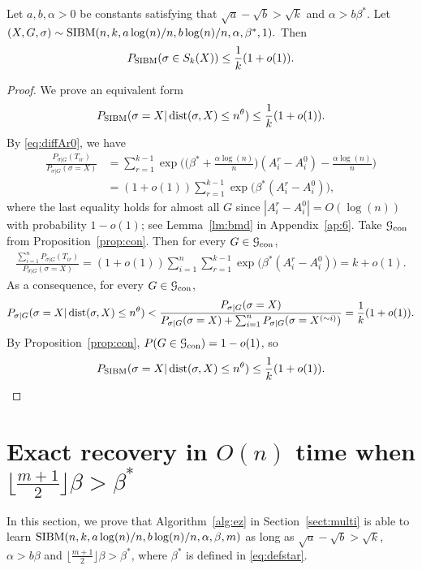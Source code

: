 \documentclass{article}
\begin{document}
\begin{proposition}  \label{prop:zj}
	Let $a,b,\alpha> 0$ be constants satisfying that $\sqrt{a}-\sqrt{b} > \sqrt{k}$ and $\alpha>b\beta^\ast$. Let 
	$
	(X,G,\sigma) \sim \operatorname{SIBM}(n,k, a\log(n)/n, b\log(n)/n,\alpha,\beta^\ast, 1) .
	$
	Then 
	$$
	P_{\operatorname{SIBM}}(\sigma \in S_k(X)) \le \frac{1}{k}(1+o(1)) .
	$$
\end{proposition}
\begin{proof}
	We prove an equivalent form
	$$
	P_{\operatorname{SIBM}}(\sigma = X | \operatorname{dist}(\sigma, X) \le n^{\theta}) \le \frac{1}{k}(1+o(1)) .
	$$
	By \eqref{eq:diffAr0}, we have
	\begin{align*}
	\frac{P_{\sigma|G}(T_{ir})}
	{P_{\sigma|G}(\sigma=X)}
	& = \sum_{r=1}^{k-1}\exp\Big(\big(\beta^\ast+\frac{\alpha\log(n)}{n} \big) (A^r_i-A^0_i)
	-\frac{\alpha\log(n)}{n} \Big) \\
	& = (1+o(1))\sum_{r=1}^{k-1} \exp\big(\beta^\ast (A^r_i-A^0_i) \big)  ,
	\end{align*}
	where the last equality holds for almost all $G$ since $|A^r_i-A^0_i|=O(\log(n))$ with probability $1-o(1)$; see Lemma~\ref{lm:bmd} in Appendix~\ref{ap:6}.
	Take $\mathcal{G}_{\operatorname{con}}$ from Proposition~\ref{prop:con}. Then for every $G\in\mathcal{G}_{\operatorname{con}}$,
	\begin{align*}
	\frac{\sum_{i=1}^n P_{\sigma|G}(T_{ir} )}
	{P_{\sigma|G}(\sigma=X)}  = (1+o(1)) \sum_{i=1}^n \sum_{r=1}^{k-1}\exp\big(\beta^\ast (A^r_i-A^0_i) \big)  =k+o(1) .
	\end{align*}
	As a consequence, for every $G\in\mathcal{G}_{\operatorname{con}}$,
	\begin{align*}
	P_{\sigma|G} (\sigma= X | \operatorname{dist}(\sigma, X) \le n^{\theta}) <
	\frac {P_{\sigma|G}(\sigma=X)}
	{P_{\sigma|G}(\sigma=X)+\sum_{i=1}^n P_{\sigma|G}(\sigma=X^{(\sim i)} )}
	=\frac{1}{k} (1+o(1)) .
	\end{align*}
	By Proposition~\ref{prop:con}, $P(G\in\mathcal{G}_{\operatorname{con}})=1-o(1)$, so
	$$
	P_{\operatorname{SIBM}}(\sigma= X | \operatorname{dist}(\sigma, X) \le n^{\theta} ) \le \frac{1}{k}(1+o(1)) .
	$$
\end{proof}
\section{Exact recovery in $O(n)$ time when $\lfloor \frac{m+1}{2} \rfloor \beta>\beta^\ast$}
\label{sect:direct}
In this section, we prove that Algorithm~\ref{alg:ez} in Section~\ref{sect:multi} is able to learn $\SIBM(n,k,a\log(n)/n, \linebreak[4] b\log(n)/n,\alpha,\beta, m)$ as long as $\sqrt{a}-\sqrt{b} > \sqrt{k}$,  $\alpha>b\beta$ and $\lfloor \frac{m+1}{2} \rfloor \beta>\beta^\ast$, where $\beta^\ast$ is defined in \eqref{eq:defstar}.
\end{document}
